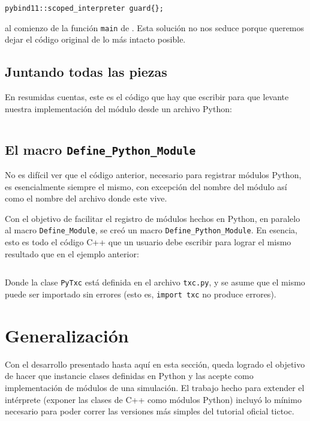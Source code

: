 \begin{verbatim}
pybind11::scoped_interpreter guard{};
\end{verbatim}

\noindent al comienzo de la función \verb!main! de \omnetpp{}.  Esta solución
no nos seduce porque queremos dejar el código original de \omnetpp{} lo más
intacto posible.

\subsection{Juntando todas las piezas}

En resumidas cuentas, este es el código que hay que escribir para que \omnetpp{}
levante nuestra implementación del módulo desde un archivo Python:

\inputminted{c++}{codelistings/omnetpy.cc}

\subsection{El macro \texttt{Define\_Python\_Module}}

No es difícil ver que el código anterior, necesario para registrar módulos
Python, es esencialmente siempre el mismo, con excepción del nombre del módulo
así como el nombre del archivo donde este vive.

Con el objetivo de facilitar el registro de módulos hechos en Python, en
paralelo al macro \verb!Define_Module!, se creó un macro
\verb!Define_Python_Module!. En esencia, esto es todo el código C++ que un
usuario debe escribir para lograr el mismo resultado que en el ejemplo
anterior:

\inputminted{c++}{codelistings/pytxc.cc}

Donde la clase \verb!PyTxc! está definida en el archivo \verb!txc.py!, y se
asume que el mismo puede ser importado sin errores (esto es, \verb!import txc!
no produce errores).

\section{Generalización}

Con el desarrollo presentado hasta aquí en esta sección, queda logrado el
objetivo de hacer que \omnetpp{} instancie clases definidas en Python y las acepte
como implementación de módulos de una simulación. El trabajo hecho para
extender el intérprete (exponer las clases de C++ como módulos Python) incluyó
lo mínimo necesario para poder correr las versiones más simples del tutorial
oficial tictoc. 

